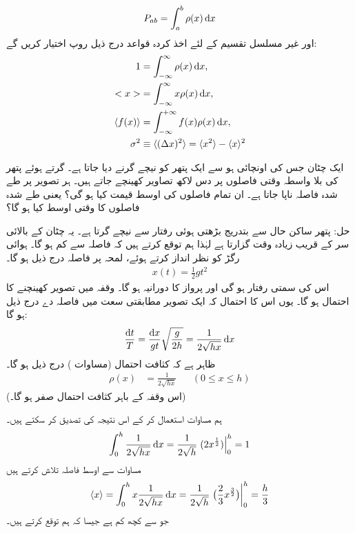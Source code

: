  \begin{align}
 P_{ab}=\int_a^b \rho(x)\dif x 
 \end{align}
اور غیر مسلسل تقسیم کے لئے اخذ کردہ قواعد درج ذیل روپ اختیار کریں گے:
\begin{align}
1&=\int_{-\infty}^{\infty} \rho(x)\dif x,  \label{مساوات_تفاعل_موج_کل_احتمال_اکائی_ہو_گا}\\
<x>& =\int_{-\infty}^{\infty} x\rho(x)\dif x, \label{مساوات_تفاعل_موج_اوسط_تکمل}\\
\langle f(x)\rangle&=\int_{-\infty}^{+\infty} f(x)\rho(x)\dif x,\\
 \sigma^2&\equiv \langle(\Delta x)^2\rangle = \langle x^2\rangle-\langle x\rangle^2 
\end{align}

ایک چٹان جس کی اونچائی  ہو سے ایک پتھر کو نیچے گرنے دیا جاتا ہے۔ گرتے ہوئے  پتھر کی بلا واسطہ وقتی فاصلوں پر دس لاکھ تصاویر کھینچے جاتے ہیں۔ ہر تصویر پر طے شدہ فاصلہ ناپا جاتا ہے۔ ان تمام فاصلوں کی اوسط قیمت کیا ہو گی؟ یعنی طے شدہ فاصلوں کا وقتی اوسط کیا ہو گا؟ 

حل: \quad
پتھر ساکن حال سے بتدریج بڑھتی ہوئی رفتار سے نیچے گرتا ہے۔ یہ چٹان کے  بالائی سر کے قریب زیادہ وقت گزارتا ہے لہٰذا  ہم توقع کرتے ہیں کہ
 فاصلہ  سے کم ہو گا۔ ہوائی رگڑ کو نظر انداز کرتے ہوئے،  لمحہ  پر فاصلہ  درج ذیل ہو گا۔
\begin{align*}
 x(t) = \frac{1}{2} gt^2 
\end{align*}
اس کی سمتی رفتار   ہو گی اور پرواز کا  دورانیہ  ہو گا۔ وقفہ   میں تصویر کھینچنے کا احتمال  ہو گا۔ یوں اس کا احتمال کہ ایک تصویر  مطابقتی سعت  میں فاصلہ دے درج ذیل ہو گا:
 \begin{align*}
 \frac{\dif t}{T} = \frac{\dif x}{gt}\sqrt{\frac{g}{2h}} = \frac{1}{2\sqrt{hx}}\dif x
\end{align*}   
 ظاہر ہے کہ کثافت احتمال  (مساوات ) درج ذیل ہو گا۔
 \begin{align*}
 \rho(x)&=\frac{1}{2\sqrt{hx}} && (0\leq x\leq h)
 \end{align*}
 (اس وقفہ کے باہر کثافت  احتمال صفر ہو گا۔) 

ہم مساوات  استعمال کر کے اس نتیجہ کی تصدیق کر سکتے ہیں۔
 \begin{align*}
 \int_0^h \frac{1}{2\sqrt{hx}}\dif x = \frac{1}{2\sqrt{h}}\left .(2x^{\frac{1}{2}})\right\vert_0^h =1
 \end{align*}
 مساوات  سے اوسط فاصلہ تلاش  کرتے ہیں
 \begin{align*}
 \langle x\rangle =\int_0^h x\frac{1}{2\sqrt{hx}}\dif x= \frac{1}{2\sqrt{h}} \left . \big(\frac{2}{3}x^{\frac{3}{2}}\big)\right\vert_0^h = \frac{h}{3}
 \end{align*}
 جو     سے کچھ کم ہے  جیسا کہ ہم توقع کرتے ہیں۔

